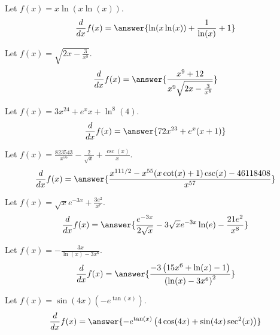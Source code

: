 \documentclass{ximera}
\begin{document}
\begin{shuffle}


\begin{exercise}
Let $f(x)=x \ln (x \ln (x))$.
\[
\ddx f(x) = \answer{\ln (x \ln (x))+\frac{1}{\ln (x)}+1}
\]
\end{exercise}

\begin{exercise}
Let $f(x)=\sqrt{2 x-\frac{3}{x^8}}$.
\[
\ddx f(x) = \answer{\frac{x^9+12}{x^9 \sqrt{2 x-\frac{3}{x^8}}}}
\]
\end{exercise}

\begin{exercise}
Let $f(x)=3 x^{24}+e^x x+\ln ^8(4)$.
\[
\ddx f(x) = \answer{72 x^{23}+e^x (x+1)}
\]
\end{exercise}

\begin{exercise}
Let $f(x)=\frac{823543}{x^{56}}-\frac{2}{\sqrt{x}}+\frac{\csc (x)}{x}$.
\[
\ddx f(x) = \answer{\frac{x^{111/2}-x^{55} (x \cot (x)+1) \csc (x)-46118408}{x^{57}}}
\]
\end{exercise}

\begin{exercise}
Let $f(x)=\sqrt{x} e^{-3 x}+\frac{3 e^2}{x^7}$.
\[
\ddx f(x) = \answer{\frac{e^{-3 x}}{2 \sqrt{x}}-3 \sqrt{x} e^{-3 x} \ln (e)-\frac{21 e^2}{x^8}}
\]
\end{exercise}

\begin{exercise}
Let $f(x)=-\frac{3 x}{\ln (x)-3 x^6}$.
\[
\ddx f(x) = \answer{\frac{-3 \left(15 x^6+\ln (x)-1\right)}{\left(\ln (x)-3 x^6\right)^2}}
\]
\end{exercise}

\begin{exercise}
Let $f(x)=\sin (4 x) \left(-e^{\tan (x)}\right)$.
\[
\ddx f(x) = \answer{-e^{\tan (x)} \left(4 \cos (4 x)+\sin (4 x) \sec ^2(x)\right)}
\]
\end{exercise}


\end{shuffle}
\end{document}
